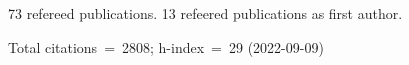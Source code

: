 73 refereed publications. 13 refeered publications as first author.

Total citations~=~2808; h-index~=~29 (2022-09-09)